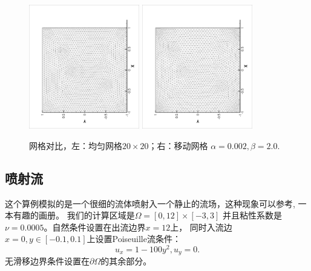           \begin{figure}[ht]
            \begin{center}
              \includegraphics[width = 0.43\textwidth, angle = -90]{picture/first/collidingFlow/uniform_mesh20.eps}
              \includegraphics[width = 0.43\textwidth, angle = -90]{picture/first/collidingFlow/moving_mesh20.eps}
              \caption{\small 网格对比，左：均匀网格$20 \times 20$；右：移动网格 $\alpha = 0.002, \beta = 2.0$.}
              \label{fig::uniform_vs_moving_mesh}
            \end{center}
          \end{figure}

     \subsection{喷射流}

       这个算例模拟的是一个很细的流体喷射入一个静止的流场，这种现象可以参考\cite{milton1982album}, 一本有趣的画册。
       我们的计算区域是$\Omega = [0, 12] \times [-3, 3]$ 并且粘性系数是$\nu = 0.0005$。自然条件设置在出流边界$x = 12$上，
       同时入流边$x = 0, y \in [-0.1, 0.1]$上设置Poiseuille流条件：
       \begin{equation}
         u_x = 1 - 100 y^2, u_y = 0.
       \end{equation}
       无滑移边界条件设置在$\partial \Omega$的其余部分。

